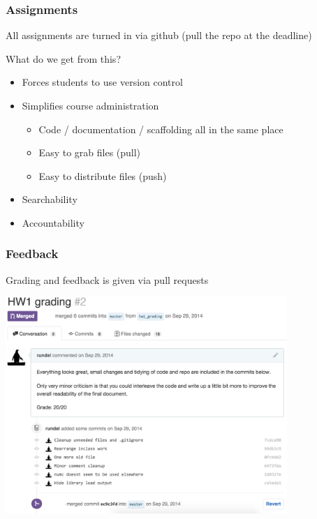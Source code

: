 \documentclass[12pt]{beamer}
\begin{document}
\begin{frame}
\frametitle{Assignments}

All assignments are turned in via github (pull the repo at the deadline)

\vspace{3mm}

What do we get from this?
\begin{itemize}
\item Forces students to use version control
\item Simplifies course administration
\begin{itemize}
\item Code / documentation / scaffolding all in the same place
\item Easy to grab files (pull)
\item Easy to distribute files (push)
\end{itemize}
\item Searchability
\item Accountability
\end{itemize}

\end{frame}



\begin{frame}
\frametitle{Feedback}

\vspace{-7mm}

Grading and feedback is given via pull requests

\begin{center}
\includegraphics[width=0.8\textwidth]{imgs/github_pull_request.png}
\end{center}

\end{frame}
\end{document}
